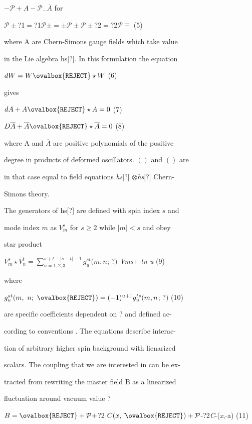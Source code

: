 \documentclass[a4paper,12pt]{article}
\begin{document}
$-\mathcal{P}+A-\mathcal{P}_{-}\overline{A}$ for
\begin{center}
$\mathcal{P}\pm$?1$=$?1$\mathcal{P}\pm =\pm \mathcal{P}\pm \mathcal{P}\pm$?2$=$?2$\mathcal{P}\mp$   (5)
\end{center}
where A are Chern-Simons gauge fields which take value

in the Lie algebra hs[?]. In this formulation the equation
\begin{center}
$dW=W\ovalbox{\tt\small REJECT}\star W$   (6)
\end{center}
gives
\begin{center}
$dA+A\ovalbox{\tt\small REJECT}\star A=0$   (7)

$D\overline{A}+\overline{A}\ovalbox{\tt\small REJECT}\star\overline{A}=0$   (8)
\end{center}
where A and $\overline{A}$ are positive polynomials of the positive

degree in products of deformed oscillators. $()$ and $()$ are

in that case equal to field equations {\it hs}[?] $\otimes${\it hs}[?] Chern-

Simons theory.

The generators of hs[?] are defined with spin index $s$ and

mode index $m$ as $V_{m}^{s}$ for $s \geq 2$ while $|m| < s$ and obey

star product

$V_{m}^{s}\displaystyle \star V_{n}^{t}=\sum_{u=1,2,3}^{s+t-|s-t|-1}g_{u}^{st} (m, n$; ?$)$ {\it Vms}$+$-{\it tn-u} (9)

where
\begin{center}
$g_{u}^{st} (m,\ n;\ \ovalbox{\tt\small REJECT})=(-1)^{u+1}g_{u}^{ts}(m, n$; ?$)$   (10)
\end{center}
are specific coefficients dependent on ? and defined ac-

cording to conventions . The equations describe interac-

tion of arbitrary higher spin background with lienarized

scalars. The coupling that we are interested in can be ex-

tracted from rewriting the master field $\mathrm{B}$ as a linearized

fluctuation around vacuum value ?

$B=\ovalbox{\tt\small REJECT} +\mathcal{P}+$?2 $C (x,\ \tilde{}\ovalbox{\tt\small REJECT}) +\mathcal{P}$-?2{\it C}-({\it x}, $\tilde{}$a) (11)
\end{document}
